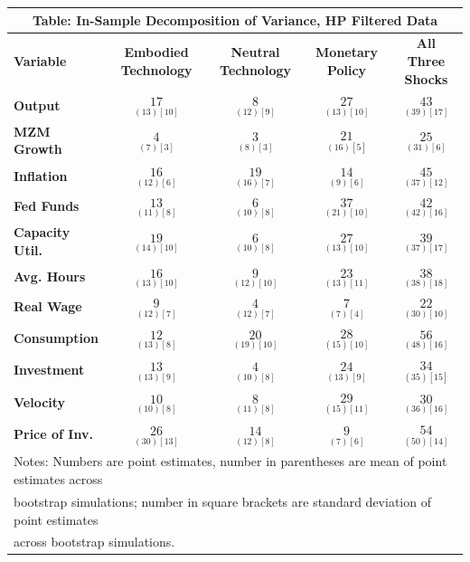 \documentclass{article}
\begin{document}
 \begin{tabular}{|l|c|@{}c|c|@{}c|} 
 \hline 
 \multicolumn{5}{|c|}{\textbf{Table: In-Sample Decomposition of Variance, HP Filtered Data}} \\ \hline 
 \textbf{Variable} & \textbf{Embodied Technology} & \textbf{Neutral Technology} & \textbf{%
 Monetary Policy} & \textbf{All Three Shocks} \\ \hline\hline 
 \textbf{Output} & $\underset{( 13)[ 10]}{ 17}$ & $\underset{( 12)[  9]}{  8}$ & $\underset{( 13)[ 10]}{ 27}$ & $\underset{( 39)[ 17]}{ 43}$ \\ \hline 
 \textbf{MZM Growth} & $\underset{(  7)[  3]}{  4}$ & $\underset{(  8)[  3]}{  3}$ & $\underset{( 16)[  5]}{ 21}$ & $\underset{( 31)[  6]}{ 25}$ \\ \hline 
 \textbf{Inflation} & $\underset{( 12)[  6]}{ 16}$ & $\underset{( 16)[  7]}{ 19}$ & $\underset{(  9)[  6]}{ 14}$ & $\underset{( 37)[ 12]}{ 45}$ \\ \hline 
 \textbf{Fed Funds} & $\underset{( 11)[  8]}{ 13}$ & $\underset{( 10)[  8]}{  6}$ & $\underset{( 21)[ 10]}{ 37}$ & $\underset{( 42)[ 16]}{ 42}$ \\ \hline 
 \textbf{Capacity Util.} & $\underset{( 14)[ 10]}{ 19}$ & $\underset{( 10)[  8]}{  6}$ & $\underset{( 13)[ 10]}{ 27}$ & $\underset{( 37)[ 17]}{ 39}$ \\ \hline 
 \textbf{Avg. Hours} & $\underset{( 13)[ 10]}{ 16}$ & $\underset{( 12)[ 10]}{  9}$ & $\underset{( 13)[ 11]}{ 23}$ & $\underset{( 38)[ 18]}{ 38}$ \\ \hline 
 \textbf{Real Wage} & $\underset{( 12)[  7]}{  9}$ & $\underset{( 12)[  7]}{  4}$ & $\underset{(  7)[  4]}{  7}$ & $\underset{( 30)[ 10]}{ 22}$ \\ \hline 
 \textbf{Consumption} & $\underset{( 13)[  8]}{ 12}$ & $\underset{( 19)[ 10]}{ 20}$ & $\underset{( 15)[ 10]}{ 28}$ & $\underset{( 48)[ 16]}{ 56}$ \\ \hline 
 \textbf{Investment} & $\underset{( 13)[  9]}{ 13}$ & $\underset{( 10)[  8]}{  4}$ & $\underset{( 13)[  9]}{ 24}$ & $\underset{( 35)[ 15]}{ 34}$ \\ \hline 
 \textbf{Velocity} & $\underset{( 10)[  8]}{ 10}$ & $\underset{( 11)[  8]}{  8}$ & $\underset{( 15)[ 11]}{ 29}$ & $\underset{( 36)[ 16]}{ 30}$ \\ \hline 
 \textbf{Price of Inv.} & $\underset{( 30)[ 13]}{ 26}$ & $\underset{( 12)[  8]}{ 14}  $ & $\underset{(  7)[  6]}{  9}$ & $\underset{( 50)[ 14]}{ 54}$ \\ \hline 
 \multicolumn{5}{|l|}{Notes: Numbers are point estimates, number in 
 parentheses are mean of point estimates across} \\ \hline 
 \multicolumn{5}{|l|}{bootstrap simulations; number in square brackets are 
 standard deviation of point estimates} \\ \hline 
 \multicolumn{5}{|l|}{across bootstrap simulations.} \\ \hline 
 \end{tabular} 
\end{document}
